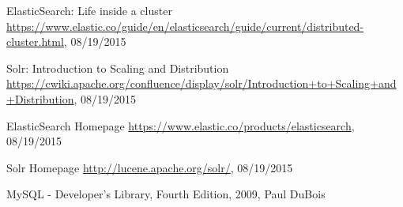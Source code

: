 \begin{thebibliography}{99}
	ElasticSearch: Life inside a cluster
	\url{https://www.elastic.co/guide/en/elasticsearch/guide/current/distributed-cluster.html}, 08/19/2015
	
	Solr: Introduction to Scaling and Distribution
	\url{https://cwiki.apache.org/confluence/display/solr/Introduction+to+Scaling+and+Distribution}, 08/19/2015
	
	ElasticSearch Homepage
	\url{https://www.elastic.co/products/elasticsearch}, 08/19/2015
	
	Solr Homepage
	\url{http://lucene.apache.org/solr/}, 08/19/2015
	
	MySQL - Developer's Library, Fourth Edition, 2009, Paul DuBois
\end{thebibliography}